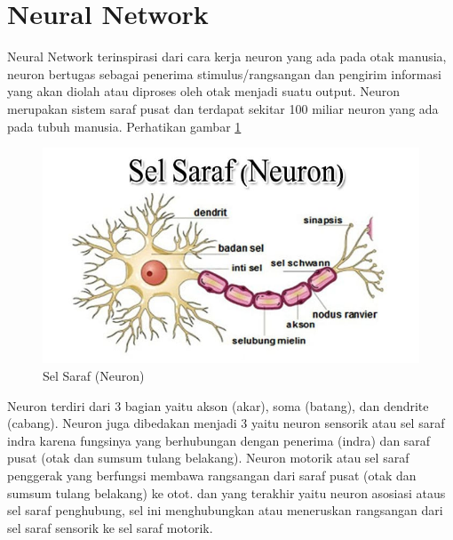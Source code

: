 \section{Neural Network}
Neural Network terinspirasi dari cara kerja neuron yang ada pada otak manusia, neuron bertugas sebagai penerima stimulus/rangsangan dan pengirim informasi yang akan diolah atau diproses oleh otak menjadi suatu output. Neuron merupakan sistem saraf pusat dan terdapat sekitar 100 miliar neuron yang ada pada tubuh manusia. Perhatikan gambar \ref{neuron}
\begin{figure}[H]
        \centerline{\includegraphics[scale=.45]{figures/neuron}}
        \caption{Sel Saraf (Neuron)}
		\label{neuron}
\end{figure}

Neuron terdiri dari 3 bagian yaitu akson (akar), soma (batang), dan dendrite (cabang). Neuron juga dibedakan menjadi 3 yaitu neuron sensorik atau sel saraf indra karena fungsinya yang berhubungan dengan penerima (indra) dan saraf pusat (otak dan sumsum tulang belakang). Neuron motorik atau sel saraf penggerak yang berfungsi membawa rangsangan dari saraf pusat (otak dan sumsum tulang belakang) ke otot. dan yang terakhir yaitu neuron asosiasi ataus sel saraf penghubung, sel ini menghubungkan atau meneruskan rangsangan dari sel saraf sensorik ke sel saraf motorik.

